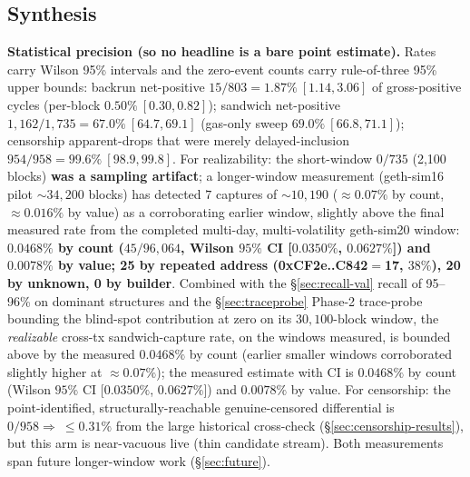 \documentclass[11pt]{article}
\begin{document}
\subsection{Synthesis}
\label{sec:synthesis}
\textbf{Statistical precision (so no headline is a bare point estimate).} Rates carry
Wilson 95\% intervals and the zero-event counts carry rule-of-three 95\% upper bounds:
backrun net-positive $15/803 = 1.87\%\ [1.14, 3.06]$ of gross-positive cycles (per-block
$0.50\%\ [0.30, 0.82]$); sandwich net-positive $1{,}162/1{,}735 = 67.0\%\ [64.7, 69.1]$
(gas-only sweep $69.0\%\ [66.8, 71.1]$); censorship apparent-drops that were merely
delayed-inclusion $954/958 = 99.6\%\ [98.9, 99.8]$. For realizability: the short-window
$0/735$ (2{,}100 blocks) \textbf{was a sampling artifact}; a longer-window measurement
(geth-sim16 pilot $\sim$$34{,}200$ blocks) has detected $7$ captures of
$\sim$$10{,}190$ ($\approx$$0.07\%$ by count, $\approx$$0.016\%$ by value) as a
corroborating earlier window, slightly above the final measured rate from the completed
multi-day, multi-volatility geth-sim20 window: \textbf{$0.0468\%$ by count
($45/96{,}064$, Wilson $95\%$ CI [$0.0350\%$, $0.0627\%$]) and $0.0078\%$ by value;
25 by repeated address (0xCF2e..C842$=$17, $38\%$), 20 by unknown, 0 by builder}. Combined with the
\S\ref{sec:recall-val} recall of 95--96\% on dominant structures and the
\S\ref{sec:traceprobe} Phase-2 trace-probe bounding the blind-spot contribution at zero
on its $30{,}100$-block window, the \emph{realizable} cross-tx sandwich-capture rate,
on the windows measured, is bounded above by the measured $0.0468\%$ by count (earlier smaller windows corroborated slightly higher at $\approx$$0.07\%$); the measured estimate with CI is $0.0468\%$ by count (Wilson $95\%$ CI [$0.0350\%$, $0.0627\%$]) and $0.0078\%$ by value. For censorship: the
point-identified, structurally-reachable genuine-censored differential is $0/958
\Rightarrow\ \le 0.31\%$ from the large historical cross-check
(\S\ref{sec:censorship-results}), but this arm is near-vacuous live (thin candidate
stream). Both measurements span future longer-window work (\S\ref{sec:future}).
\end{document}
